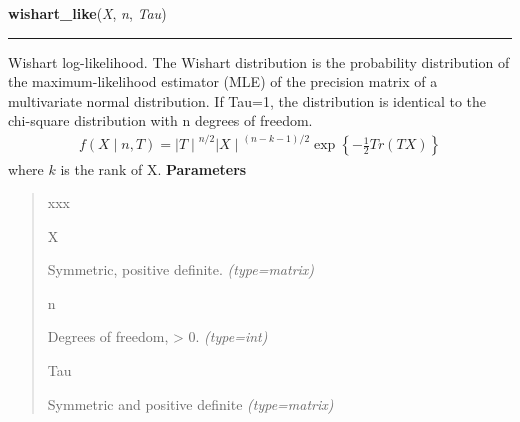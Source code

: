     \label{pymc:distributions:wishart_like}

    \vspace{0.5ex}

\hspace{.8\funcindent}\begin{boxedminipage}{\funcwidth}

    \raggedright \textbf{wishart\_like}(\textit{X}, \textit{n}, \textit{Tau})

    \vspace{-1.5ex}

    \rule{\textwidth}{0.5\fboxrule}
\setlength{\parskip}{2ex}

Wishart log-likelihood. The Wishart distribution is the probability
distribution of the maximum-likelihood estimator (MLE) of the precision
matrix of a multivariate normal distribution. If Tau=1, the distribution
is identical to the chi-square distribution with n degrees of freedom.
\begin{equation*}\begin{split}f(X \mid n, T) = {\mid T \mid}^{n/2}{\mid X \mid}^{(n-k-1)/2} \exp\left\{ -\frac{1}{2} Tr(TX) \right\}\end{split}\end{equation*}
where $k$ is the rank of X.
\setlength{\parskip}{1ex}
      \textbf{Parameters}
      \vspace{-1ex}

      \begin{quote}
        \begin{Ventry}{xxx}

          \item[X]


Symmetric, positive definite.
            {\it (type=matrix)}

          \item[n]


Degrees of freedom, {\textgreater} 0.
            {\it (type=int)}

          \item[Tau]


Symmetric and positive definite
            {\it (type=matrix)}

        \end{Ventry}

      \end{quote}

    \end{boxedminipage}

